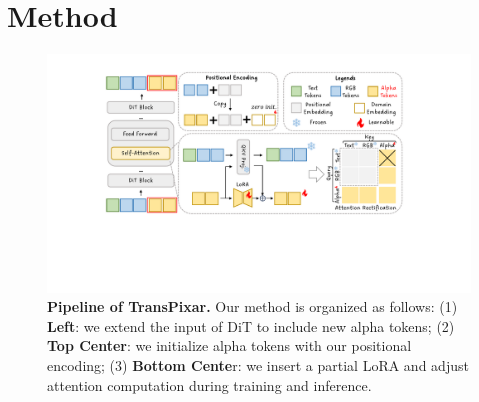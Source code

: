 \section{Method}
\label{sec:method}

\begin{figure}[t]
    \centering
    \includegraphics[width=1.0\linewidth]{figs/method-pipeline.pdf}
    \vspace{-0.2in}
    \caption{\textbf{Pipeline of TransPixar.} Our method is organized as follows: (1) \textbf{Left}: we extend the input of DiT to include new alpha tokens; (2) \textbf{Top Center}: we initialize alpha tokens with our positional encoding; (3) \textbf{Bottom Cente}r: we insert a partial LoRA and adjust attention computation during training and inference.}
    \label{fig-pipeline}
    \vspace{-0.1in}
\end{figure}


